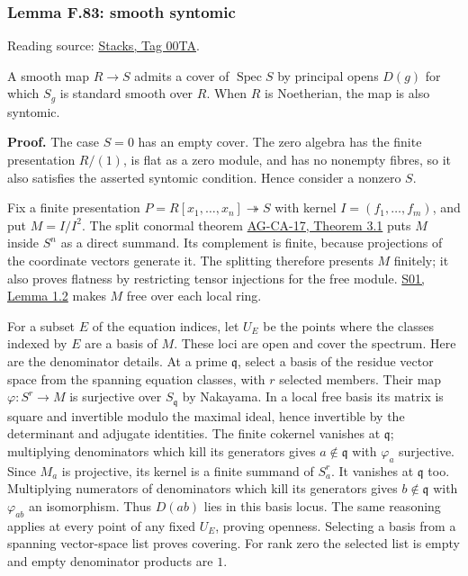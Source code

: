 \documentclass[11pt,a4paper,openany]{report}
\newcounter{none}
\begin{document}
\label{AG-RG-S05-algebra-lemma-smooth-syntomic}

\subsubsection{Lemma F.83: smooth syntomic}\label{AG-RG-S05-lemma-f.83-smooth-syntomic}

Reading source: \href{https://stacks.math.columbia.edu/tag/00TA}{Stacks, Tag 00TA}.

A smooth map \(R\to S\) admits a cover of \(\operatorname{Spec}S\) by principal opens \(D(g)\) for which \(S_g\) is standard smooth over \(R\). When \(R\) is Noetherian, the map is also syntomic.

\textbf{Proof.} The case \(S=0\) has an empty cover. The zero algebra has the finite presentation \(R/(1)\), is flat as a zero module, and has no nonempty fibres, so it also satisfies the asserted syntomic condition. Hence consider a nonzero \(S\).

Fix a finite presentation \(P=R[x_1,\ldots,x_n]\twoheadrightarrow S\) with kernel \(I=(f_1,\ldots,f_m)\), and put \(M=I/I^2\). The split conormal theorem \href{https://github.com/KokunoYumeto/open-math-courses/blob/d02d0a3669f42579db037cd44de1d113fdd770a1/docs/courses/AG-CA/src/formally-smooth-unramified-and-etale-ring-maps.md}{AG-CA-17, Theorem 3.1} puts \(M\) inside \(S^n\) as a direct summand. Its complement is finite, because projections of the coordinate vectors generate it. The splitting therefore presents \(M\) finitely; it also proves flatness by restricting tensor injections for the free module. \href{https://github.com/KokunoYumeto/open-math-courses/blob/main/docs/courses/AG-RG/AG-RG-S01.md}{S01, Lemma 1.2} makes \(M\) free over each local ring.

For a subset \(E\) of the equation indices, let \(U_E\) be the points where the classes indexed by \(E\) are a basis of \(M\). These loci are open and cover the spectrum. Here are the denominator details. At a prime \(\mathfrak q\), select a basis of the residue vector space from the spanning equation classes, with \(r\) selected members. Their map \(\varphi:S^r\to M\) is surjective over \(S_{\mathfrak q}\) by Nakayama. In a local free basis its matrix is square and invertible modulo the maximal ideal, hence invertible by the determinant and adjugate identities. The finite cokernel vanishes at \(\mathfrak q\); multiplying denominators which kill its generators gives \(a\notin\mathfrak q\) with \(\varphi_a\) surjective. Since \(M_a\) is projective, its kernel is a finite summand of \(S_a^r\). It vanishes at \(\mathfrak q\) too. Multiplying numerators of denominators which kill its generators gives \(b\notin\mathfrak q\) with \(\varphi_{ab}\) an isomorphism. Thus \(D(ab)\) lies in this basis locus. The same reasoning applies at every point of any fixed \(U_E\), proving openness. Selecting a basis from a spanning vector-space list proves covering. For rank zero the selected list is empty and empty denominator products are \(1\).
\end{document}
